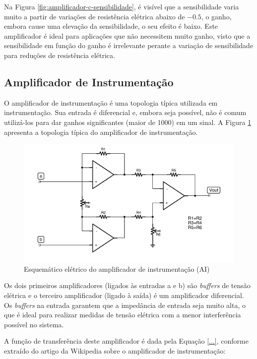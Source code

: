 \documentclass[a4paper]{instrumentacao}
\begin{document}
Na Figura \ref{fig:amplificador-c-sensibilidade}, é visível que a sensibilidade varia muito a partir de variações de resistência elétrica abaixo de $-0.5$, o ganho, embora cause uma elevação da sensibilidade, o seu efeito é baixo. Este amplificador é ideal para aplicações que não necessitem muito ganho, visto que a sensibilidade em função do ganho é irrelevante perante a variação de sensibilidade para reduções de resistência elétrica.

\subsection{Amplificador de Instrumentação}

O amplificador de instrumentação é uma topologia típica utilizada em instrumentação. Sua entrada é diferencial e, embora seja possível, não é comum utilizá-los para dar ganhos significantes (maior de 1000) em um sinal. A Figura \ref{fig:amplificador-instrumentacao} apresenta a topologia típica do amplificador de instrumentação.

\begin{figure}[H]
\center
\includegraphics[width=\textwidth]{Amplificador-Instrumentacao.pdf}
\caption{Esquemático elétrico do amplificador de instrumentação (AI)}
\label{fig:amplificador-instrumentacao}
\end{figure}

Os dois primeiros amplificadores (ligados às entradas a e b) são \textit{buffers} de tensão elétrica e o terceiro amplificador (ligado à saída) é um amplificador diferencial. Os \textit{buffers} na entrada garantem que a impedância de entrada seja muito alta, o que é ideal para realizar medidas de tensão elétrica com a menor interferência possível no sistema.

A função de transferência deste amplificador é dada pela Equação \ref{...}, conforme extraído do artigo da Wikipedia\cite{wikipedia-ia} sobre o amplificador de instrumentação:
\end{document}
